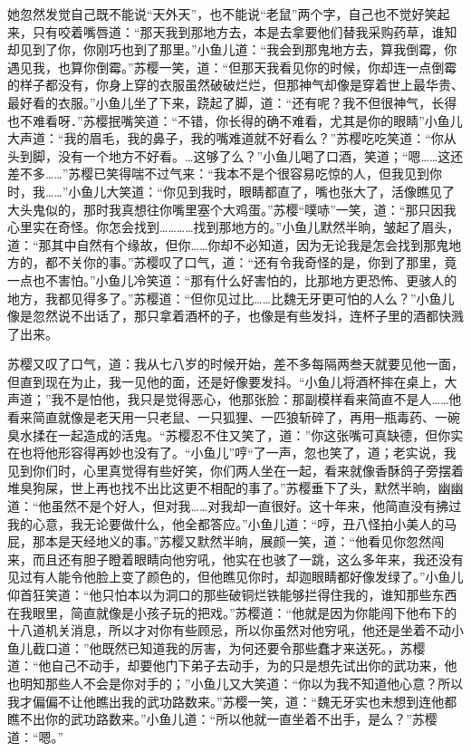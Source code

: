 \documentclass[12pt,oneside]{book}
\begin{document}
她忽然发觉自己既不能说``天外天''，也不能说``老鼠''两个字，自己也不觉好笑起来，只有咬着嘴唇道：``那天我到那地方去，本是去拿要他们替我采购药草，谁知却见到了你，你刚巧也到了那里。''小鱼儿道：``我会到那鬼地方去，算我倒霉，你遇见我，也算你倒霉。''苏樱一笑，道：``但那天我看见你的时候，你却连一点倒霉的样子都没有，你身上穿的衣服虽然破破烂烂，但那神气却像是穿着世上最华贵、最好看的衣服。''小鱼儿坐了下来，跷起了脚，道：``还有呢？我不但很神气，长得也不难看呀．''苏樱抿嘴笑道：``不错，你长得的确不难看，尤其是你的眼睛''小鱼儿大声道：``我的眉毛，我的鼻子，我的嘴难道就不好看么？''苏樱吃吃笑道：``你从头到脚，没有一个地方不好看。\ldots 这够了么？''小鱼儿喝了口酒，笑道；``嗯\ldots\ldots 这还差不多\ldots\ldots{}''苏樱已笑得喘不过气来：``我本不是个很容易吃惊的人，但我见到你时，我\ldots\ldots{}''小鱼儿大笑道：``你见到我时，眼睛都直了，嘴也张大了，活像瞧见了大头鬼似的，那时我真想往你嘴里塞个大鸡蛋。''苏樱``噗哧''一笑，道：``那只因我心里实在奇怪。你怎会找到\ldots\ldots\ldots\ldots 找到那地方的。''小鱼儿默然半晌，皱起了眉头，道：``那其中自然有个缘故，但你\ldots\ldots 你却不必知道，因为无论我是怎会找到那鬼地方的，都不关你的事。''苏樱叹了口气，道：``还有令我奇怪的是，你到了那里，竟一点也不害怕。''小鱼儿冷笑道：``那有什么好害怕的，比那地方更恐怖、更骇人的地方，我都见得多了。''苏樱道：``但你见过比\ldots\ldots 比魏无牙更可怕的人么？''小鱼儿像是忽然说不出话了，那只拿着酒杯的子，也像是有些发抖，连杯子里的酒都快溅了出来。

苏樱又叹了口气，道：我从七八岁的时候开始，差不多每隔两叁天就要见他一面，但直到现在为止，我一见他的面，还是好像要发抖。``小鱼儿将酒杯摔在桌上，大声道；''我不是怕他，我只是觉得恶心，他那张脸：那副模样看来简直不是人\ldots\ldots 他看来简直就像是老天用一只老鼠、一只狐狸、一匹狼斩碎了，再用─瓶毒药、一碗臭水揉在一起造成的活鬼。``苏樱忍不住又笑了，道：''你这张嘴可真缺德，但你实在也将他形容得再妙也没有了。``小鱼儿''哼``了一声，忽也笑了，道；老实说，我见到你们时，心里真觉得有些好笑，你们两人坐在一起，看来就像香酥鸽子旁摆着堆臭狗屎，世上再也找不出比这更不相配的事了。''苏樱垂下了头，默然半晌，幽幽道：``他虽然不是个好人，但对我\ldots\ldots 对我却一直很好。这十年来，他简直没有拂过我的心意，我无论要做什么，他全都答应。''小鱼儿道：``哼，丑八怪拍小美人的马屁，那本是天经地义的事。''苏樱又默然半晌，展颜一笑，道：``他看见你忽然闯来，而且还有胆子瞪着眼睛向他穷吼，他实在也骇了一跳，这么多年来，我还没有见过有人能令他脸上变了颜色的，但他瞧见你时，却迦眼睛都好像发绿了。''小鱼儿仰首狂笑道：``他只怕本以为洞口的那些破铜烂铁能够拦得住我的，谁知那些东西在我眼里，简直就像是小孩子玩的把戏。''苏樱道：``他就是因为你能闯下他布下的十八道机关消息，所以才对你有些顾忌，所以你虽然对他穷吼，他还是坐着不动小鱼儿截口道：''他既然已知道我的厉害，为何还要令那些蠢才来送死。，苏樱道：``他自己不动手，却要他门下弟子去动手，为的只是想先试出你的武功来，他也明知那些人不会是你对手的；''小鱼儿又大笑道：``你以为我不知道他心意？所以我才偏偏不让他瞧出我的武功路数来。''苏樱一笑，道：``魏无牙实也未想到连他都瞧不出你的武功路数来。''小鱼儿道：``所以他就一直坐着不出手，是么？''苏樱道：``嗯。''
\end{document}
